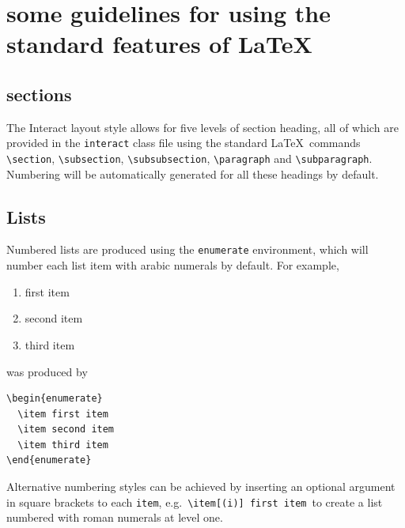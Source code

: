 \documentclass[]{interact}
\theoremstyle{plain}%
\theoremstyle{definition}
\theoremstyle{remark}
\begin{document}
\section{some guidelines for using the standard features of \LaTeX}

\subsection{sections}

The \textsf{Interact} layout style allows for five levels of section heading, all of which are provided in the \texttt{interact} class file using the standard \LaTeX\ commands \verb"\section", \verb"\subsection", \verb"\subsubsection", \verb"\paragraph" and \verb"\subparagraph". Numbering will be automatically generated for all these headings by default.


\subsection{Lists}

Numbered lists are produced using the \texttt{enumerate} environment, which will number each list item with arabic numerals by default. For example,
\begin{enumerate}
  \item first item
  \item second item
  \item third item
\end{enumerate}
was produced by
\begin{verbatim}
\begin{enumerate}
  \item first item
  \item second item
  \item third item
\end{enumerate}
\end{verbatim}
Alternative numbering styles can be achieved by inserting an optional argument in square brackets to each \verb"item", e.g.\ \verb"\item[(i)] first item"\, to create a list numbered with roman numerals at level one.
\end{document}
